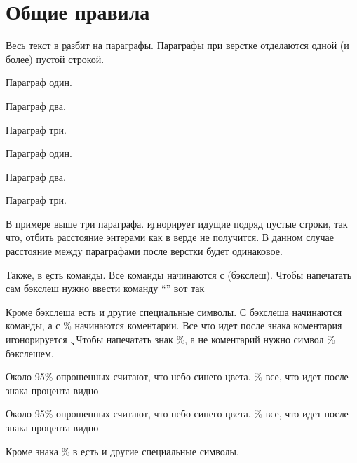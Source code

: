 \chapter{Общие правила}

Весь текст в \c разбит на параграфы. Параграфы при верстке отделаются
одной (и более) пустой строкой.

 \hfill
\startTEX
Параграф один.

Параграф два.


Параграф три.
\stopTEX
\stopdescr

 \hfill
\startCODERESULT
Параграф один.

Параграф два.


Параграф три.
\stopCODERESULT
\stopdescr

В примере выше три параграфа. \c игнорирует идущие подряд пустые строки, так
что, отбить расстояние энтерами как в верде не получится. В данном случае
расстояние между параграфами после верстки будет одинаковое.

Также, в \c есть команды. Все команды начинаются с \tex{} (бэкслеш). Чтобы
напечатать сам бэкслеш нужно ввести команду ``'' вот так

\vbox{
 \hfill
\startTEX
\tex{}
\stopTEX
\stopdescr
}

\vbox{
 \hfill
\startCODERESULT
\tex{}
\stopCODERESULT
\stopdescr
}

Кроме бэкслеша есть и другие специальные символы. С бэкслеша начинаются команды,
а с \% начинаются коментарии. Все что идет после знака коментария
игонорируется \c. Чтобы напечатать знак \%, а не коментарий
нужно  символ \% бэкслешем.

 \hfill
\startTEX
Около 95\% опрошенных считают, что небо синего цвета.
\% все, что идет после знака процента видно
\stopTEX
\stopdescr

 \hfill
\startCODERESULT
Около 95\% опрошенных считают, что небо синего цвета.
\% все, что идет после знака процента видно
\stopCODERESULT
\stopdescr

Кроме знака \% в \c есть и другие специальные символы.

